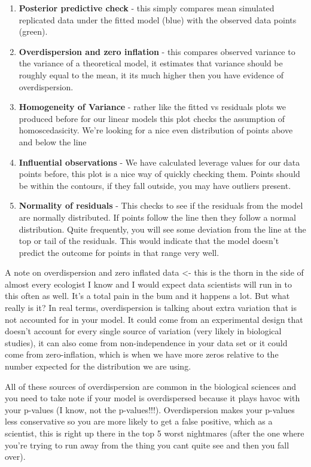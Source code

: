 \documentclass[
]{book}
\providecommand{\tightlist}{%
  \setlength{\itemsep}{0pt}\setlength{\parskip}{0pt}}
\begin{document}
\begin{enumerate}
\def\labelenumi{\arabic{enumi})}
\tightlist
\item
  \textbf{Posterior predictive check} - this simply compares mean simulated replicated data under the fitted model (blue) with the observed data points (green).
\item
  \textbf{Overdispersion and zero inflation} - this compares observed variance to the variance of a theoretical model, it estimates that variance should be roughly equal to the mean, it its much higher then you have evidence of overdispersion.
\item
  \textbf{Homogeneity of Variance} - rather like the fitted vs residuals plots we produced before for our linear models this plot checks the assumption of homoscedasicity. We're looking for a nice even distribution of points above and below the line
\item
  \textbf{Influential observations} - We have calculated leverage values for our data points before, this plot is a nice way of quickly checking them. Points should be within the contours, if they fall outside, you may have outliers present.
\item
  \textbf{Normality of residuals} - This checks to see if the residuals from the model are normally distributed. If points follow the line then they follow a normal distribution. Quite frequently, you will see some deviation from the line at the top or tail of the residuals. This would indicate that the model doesn't predict the outcome for points in that range very well.
\end{enumerate}

A note on overdispersion and zero inflated data \textless- this is the thorn in the side of almost every ecologist I know and I would expect data scientists will run in to this often as well. It's a total pain in the bum and it happens a lot. But what really is it? In real terms, overdispersion is talking about extra variation that is not accounted for in your model. It could come from an experimental design that doesn't account for every single source of variation (very likely in biological studies), it can also come from non-independence in your data set or it could come from zero-inflation, which is when we have more zeros relative to the number expected for the distribution we are using.

All of these sources of overdispersion are common in the biological sciences and you need to take note if your model is overdispersed because it plays havoc with your p-values (I know, not the p-values!!!). Overdispersion makes your p-values less conservative so you are more likely to get a false positive, which as a scientist, this is right up there in the top 5 worst nightmares (after the one where you're trying to run away from the thing you cant quite see and then you fall over).
\end{document}
